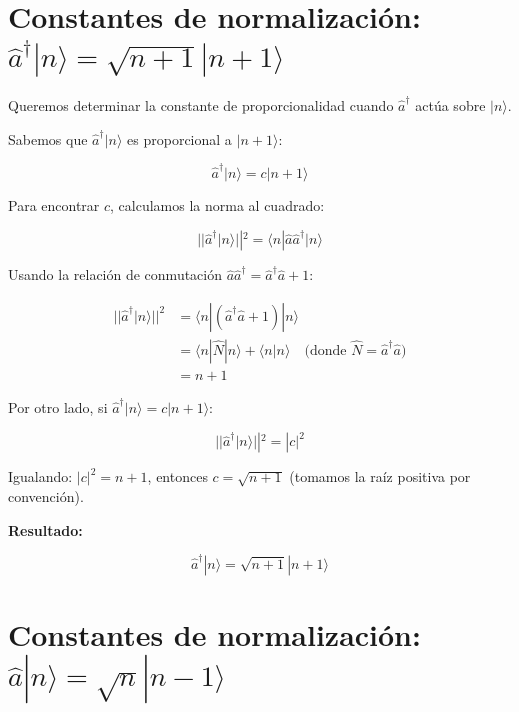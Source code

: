 \section{Constantes de normalización: $\hat{a}^\dagger|n\rangle = \sqrt{n+1}|n+1\rangle$} \label{sec:normalizacion1}

Queremos determinar la constante de proporcionalidad cuando $\hat{a}^\dagger$ actúa sobre $|n\rangle$.

Sabemos que $\hat{a}^\dagger|n\rangle$ es proporcional a $|n+1\rangle$:

\begin{equation}
	\hat{a}^\dagger|n\rangle = c|n+1\rangle
\end{equation}

Para encontrar $c$, calculamos la norma al cuadrado:

\begin{equation}
	||\hat{a}^\dagger|n\rangle||^2 = \langle n|\hat{a}\hat{a}^\dagger|n\rangle
\end{equation}

Usando la relación de conmutación $\hat{a}\hat{a}^\dagger = \hat{a}^\dagger\hat{a} + 1$:

\begin{align}
	||\hat{a}^\dagger|n\rangle||^2 &= \langle n|(\hat{a}^\dagger\hat{a} + 1)|n\rangle \tag{A.14}\\
	&= \langle n|\hat{N}|n\rangle + \langle n|n\rangle \quad \text{(donde } \hat{N} = \hat{a}^\dagger\hat{a}\text{)} \tag{A.15}\\
	&= n + 1 \tag{A.16}
\end{align}

Por otro lado, si $\hat{a}^\dagger|n\rangle = c|n+1\rangle$:

\begin{equation}
	||\hat{a}^\dagger|n\rangle||^2 = |c|^2
\end{equation}

Igualando: $|c|^2 = n + 1$, entonces $c = \sqrt{n+1}$ (tomamos la raíz positiva por convención).

\textbf{Resultado:}

\begin{equation}
	\boxed{\hat{a}^\dagger|n\rangle = \sqrt{n+1}|n+1\rangle}
\end{equation}

	

\section{Constantes de normalización: $\hat{a}|n\rangle = \sqrt{n}|n-1\rangle$} \label{sec:normalizacion2}

